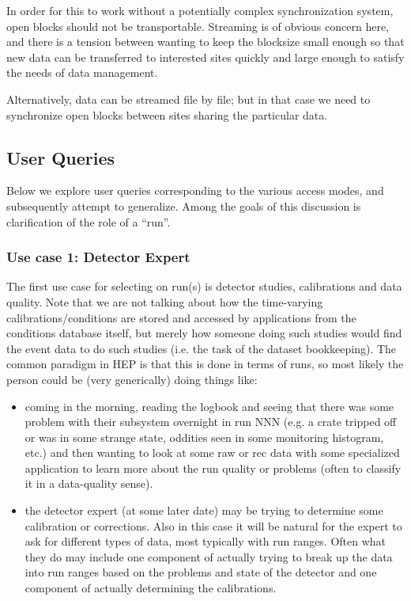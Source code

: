 \documentclass{cmspaper}
\begin{document}
In order for this to work without a potentially complex synchronization system, 
open blocks should not be transportable. Streaming is of obvious concern here, 
and there is a tension between wanting to keep the blocksize small enough so that 
new data can be transferred to interested sites quickly and large enough to satisfy 
the needs of data management.

Alternatively, data can be streamed file by file; but in that case we need to synchronize
open blocks between sites sharing the particular data.

\subsection{User Queries}

Below we explore user queries corresponding to the various access modes,
and subsequently attempt to generalize. Among the goals of this discussion
is clarification of the role of a ``run''.

\subsubsection{Use case 1: Detector Expert}

  The first use case for selecting on run(s) is detector studies, calibrations
and data quality. Note that we are not talking about how the time-varying 
calibrations/conditions are stored and accessed by applications from the 
conditions database itself, but merely how someone doing such studies would 
find the event data to do such studies (i.e. the task of the dataset 
bookkeeping). The common paradigm in HEP is that this is done in terms
of runs, so most likely the person could be (very generically) doing things 
like:
\begin{itemize}
\item coming in the morning, reading the logbook and seeing that there was
     some problem with their subsystem overnight in run NNN (e.g. a crate 
     tripped off or was in some strange state, oddities seen in some 
     monitoring histogram, etc.) and then wanting to look at some raw or 
     rec data with some specialized application to learn more about the
     run quality or problems (often to classify it in a data-quality sense).
\item the detector expert (at some later date) may be trying to determine
     some calibration or corrections. Also in this case it will be natural
     for the expert to ask for different types of data, most typically with
     run ranges. Often what they do may include one component of actually 
     trying to break up the data into run ranges based on the problems and
     state of the detector and one component of actually determining the
     calibrations. 
\end{itemize}
\end{document}
